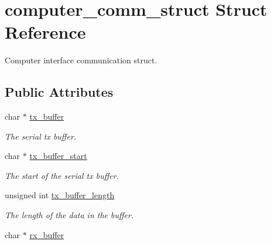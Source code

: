 \hypertarget{structcomputer__comm__struct}{
\section{computer\_\-comm\_\-struct Struct Reference}
\label{structcomputer__comm__struct}
}
Computer interface communication struct.  


\subsection*{Public Attributes}
\begin{CompactItemize}
\item 
\hypertarget{structcomputer__comm__struct_d1d0b4a23f1830000def745e8cf5a020}{
char $\ast$ \hyperlink{structcomputer__comm__struct_d1d0b4a23f1830000def745e8cf5a020}{tx\_\-buffer}}
\label{structcomputer__comm__struct_d1d0b4a23f1830000def745e8cf5a020}

\begin{CompactList}\small\item\em The serial tx buffer. \item\end{CompactList}\item 
\hypertarget{structcomputer__comm__struct_4ca744e7907572ac490e6bcea507b114}{
char $\ast$ \hyperlink{structcomputer__comm__struct_4ca744e7907572ac490e6bcea507b114}{tx\_\-buffer\_\-start}}
\label{structcomputer__comm__struct_4ca744e7907572ac490e6bcea507b114}

\begin{CompactList}\small\item\em The start of the serial tx buffer. \item\end{CompactList}\item 
\hypertarget{structcomputer__comm__struct_fe48e92d672455f3576168b6a9a36e47}{
unsigned int \hyperlink{structcomputer__comm__struct_fe48e92d672455f3576168b6a9a36e47}{tx\_\-buffer\_\-length}}
\label{structcomputer__comm__struct_fe48e92d672455f3576168b6a9a36e47}

\begin{CompactList}\small\item\em The length of the data in the buffer. \item\end{CompactList}\item 
\hypertarget{structcomputer__comm__struct_0d4797da4a237305a47c793e2a10eb23}{
char $\ast$ \hyperlink{structcomputer__comm__struct_0d4797da4a237305a47c793e2a10eb23}{rx\_\-buffer}}
\label{structcomputer__comm__struct_0d4797da4a237305a47c793e2a10eb23}


\end{CompactItemize}

